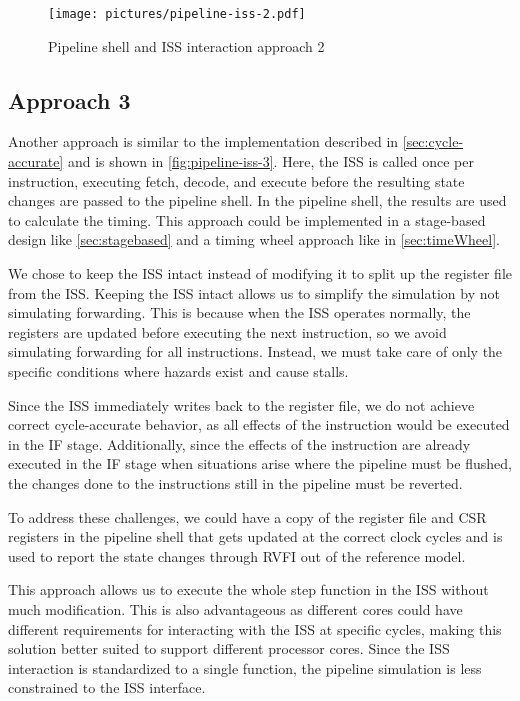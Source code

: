 \begin{figure}[ht]
    \centering
    \texttt{[image: pictures/pipeline-iss-2.pdf]}
    \caption{Pipeline shell and ISS interaction approach 2}
    \label{fig:pipeline-iss-2}
\end{figure}

\subsection{Approach 3}
\label{sec:app3}

Another approach is similar to the implementation described in \cref{sec:cycle-accurate} and is shown in \cref{fig:pipeline-iss-3}. Here, the ISS is called once per instruction, executing fetch, decode, and execute before the resulting state changes are passed to the pipeline shell. In the pipeline shell, the results are used to calculate the timing. This approach could be implemented in a stage-based design like \cref{sec:stagebased} and a timing wheel approach like in \cref{sec:timeWheel}.

We chose to keep the ISS intact instead of modifying it to split up the register file from the ISS. Keeping the ISS intact allows us to simplify the simulation by not simulating forwarding. This is because when the ISS operates normally, the registers are updated before executing the next instruction, so we avoid simulating forwarding for all instructions. Instead, we must take care of only the specific conditions where hazards exist and cause stalls. 

Since the ISS immediately writes back to the register file, we do not achieve correct cycle-accurate behavior, as all effects of the instruction would be executed in the IF stage. Additionally, since the effects of the instruction are already executed in the IF stage when situations arise where the pipeline must be flushed, the changes done to the instructions still in the pipeline must be reverted. 

To address these challenges, we could have a copy of the register file and CSR registers in the pipeline shell that gets updated at the correct clock cycles and is used to report the state changes through RVFI out of the reference model.

This approach allows us to execute the whole step function in the ISS without much modification. This is also advantageous as different cores could have different requirements for interacting with the ISS at specific cycles, making this solution better suited to support different processor cores. Since the ISS interaction is standardized to a single function, the pipeline simulation is less constrained to the ISS interface. 

